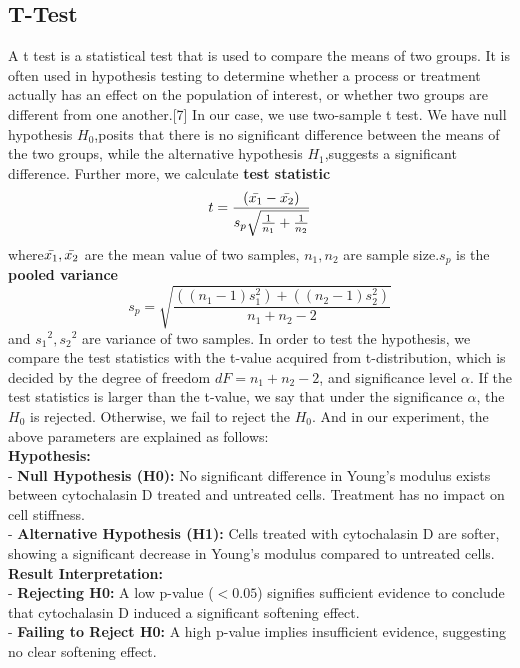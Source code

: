 \documentclass[a4paper,english,12pt,bibliography=totoc]{scrreprt}
\begin{document}
\subsection{T-Test}
\label{subsec:ttest}
A t test is a statistical test that is used to compare the means of two groups. It is often used in hypothesis testing to determine whether a process or treatment actually has an effect on the population of interest, or whether two groups are different from one another.[7] In our case, we use two-sample t test. We have null hypothesis $H_0$,posits that there is no significant difference between the means of the two groups, while the alternative hypothesis $H_1$,suggests a significant difference.
Further more, we calculate \textbf{test statistic}
\[t = \frac{(\Bar{x_1}-\Bar{x_2})}{{s_p}\sqrt{{\frac{1}{n_1}}+\frac{1}{n_2}}}\]
where\(\Bar{x_1} , \Bar{x_2}\) are the mean value of two samples, \(n_1 , n_2\) are sample size.\(s_p\) is the \textbf{pooled variance}
\[s_p = \sqrt{\frac{((n_1 - 1)s_1^2)+((n_2-1)s_2^2)}{n_1+n_2-2}}\]
and \({s_1}^{2}, {s_2}^{2}\) are variance of two samples.
In order to test the hypothesis, we compare the test statistics with the t-value acquired from t-distribution, which is decided by the degree of freedom $dF = n_1+n_2-2$, and significance level $\alpha$. If the test statistics is larger than the t-value, we say that under the significance $\alpha$, the $H_0$ is rejected. Otherwise, we fail to reject the $H_0$. And in our experiment, the above parameters are explained as follows:\\

\textbf{Hypothesis:}\\
- \textbf{Null Hypothesis (H0):} No significant difference in Young's modulus exists between cytochalasin D treated and untreated cells. Treatment has no impact on cell stiffness.\\
- \textbf{Alternative Hypothesis (H1):} Cells treated with cytochalasin D are softer, showing a significant decrease in Young's modulus compared to untreated cells.\\

\textbf{Result Interpretation:}\\
- \textbf{Rejecting H0:} A low p-value (\(<0.05\)) signifies sufficient evidence to conclude that cytochalasin D induced a significant softening effect.\\
- \textbf{Failing to Reject H0:} A high p-value implies insufficient evidence, suggesting no clear softening effect.\\
\end{document}
